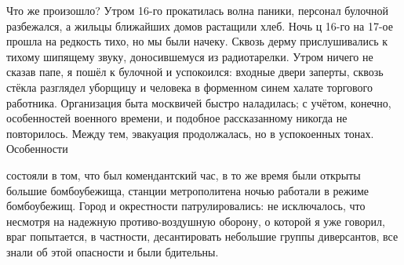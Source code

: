 \label{222-1}
Что же произошло? Утром 16-го прокатилась волна паники, персонал булочной разбежался, а жильцы ближайших домов растащили хлеб. Ночь ц 16-го на 17-ое прошла на редкость тихо, но мы были начеку. Сквозь дерму прислушивались к тихому шипящему звуку, доносившемуся из радиотарелки. Утром ничего не сказав папе, я пошёл к булочной и успокоился: входные двери заперты, сквозь стёкла разглядел уборщицу и человека в форменном синем халате торгового работника. Организация быта москвичей быстро наладилась; с учётом, конечно, особенностей военного времени, и подобное рассказанному никогда не повторилось. Между тем, эвакуация продолжалась, но в успокоенных тонах. Особенности

\label{223-1}
состояли в том, что был комендантский час, в то же время были открыты большие бомбоубежища, станции метрополитена ночью работали в режиме бомбоубежищ. Город и окрестности патрулировались: не исключалось, что несмотря на надежную противо-воздушную оборону, о которой я уже говорил, враг попытается, в частности, десантировать небольшие группы диверсантов, все знали об этой опасности и были бдительны.

